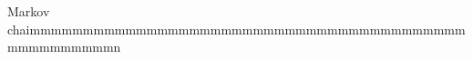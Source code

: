 \documentclass[preview]{standalone}
\begin{document}
\begin{center}
Markov chaimmmmmmmmmmmmmmmmmmmmmmmmmmmmmmmmmmmmmmmmmmmmmmmmmmmn
\end{center}
\end{document}
